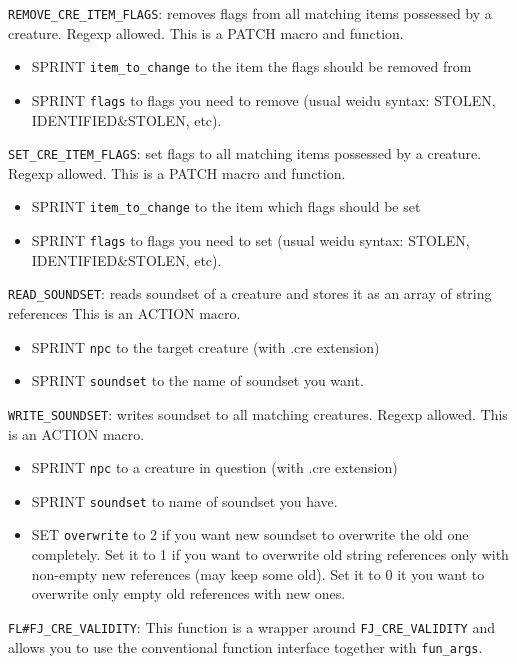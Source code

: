 \documentclass{article}
\def\ttref#1{\ahrefloc{#1}{\tt #1}}
\begin{document}
\verb+REMOVE_CRE_ITEM_FLAGS+: removes flags from all matching items possessed by a creature. Regexp allowed.
This is a PATCH macro and function.
\begin{itemize}
\item SPRINT \verb+item_to_change+ to the item the flags should be removed from
\item SPRINT \verb+flags+ to flags you need to remove (usual weidu syntax: STOLEN, IDENTIFIED&STOLEN, etc).
\end{itemize}

\verb+SET_CRE_ITEM_FLAGS+: set flags to all matching items possessed by a creature. Regexp allowed.
This is a PATCH macro and function.
\begin{itemize}
\item SPRINT \verb+item_to_change+ to the item which flags should be set
\item SPRINT \verb+flags+ to flags you need to set (usual weidu syntax: STOLEN, IDENTIFIED&STOLEN, etc).
\end{itemize}

\verb+READ_SOUNDSET+: reads soundset of a creature and stores it as an array of string references %
This is an ACTION macro.
\begin{itemize}
\item SPRINT \verb+npc+ to the target creature (with .cre extension)
\item SPRINT \verb+soundset+ to the name of soundset you want.
\end{itemize}

\verb+WRITE_SOUNDSET+: writes soundset to all matching creatures. Regexp allowed.
This is an ACTION macro.
\begin{itemize}
\item SPRINT \verb+npc+ to a creature in question (with .cre extension)
\item SPRINT \verb+soundset+ to name of soundset you have.
\item SET \verb+overwrite+ to 2 if you want new soundset to overwrite the old one completely. Set it to 1 if you want to overwrite old string references only with non-empty new references (may keep some old). Set it to 0 it you want to overwrite only empty old references with new ones.
\end{itemize}

\verb+FL#FJ_CRE_VALIDITY+: This function is a wrapper around
\verb+FJ_CRE_VALIDITY+ and allows you to use the conventional function
interface together with \ttref{MODDER} \verb+fun_args+.
\end{document}
